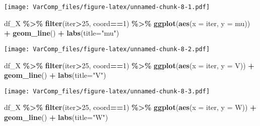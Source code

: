 \documentclass[
]{article}
\newenvironment{Shaded}{\begin{snugshade}}{\end{snugshade}}
\newcommand{\AttributeTok}[1]{\textcolor[rgb]{0.13,0.29,0.53}{#1}}
\newcommand{\DecValTok}[1]{\textcolor[rgb]{0.00,0.00,0.81}{#1}}
\newcommand{\FunctionTok}[1]{\textcolor[rgb]{0.13,0.29,0.53}{\textbf{#1}}}
\newcommand{\NormalTok}[1]{#1}
\newcommand{\SpecialCharTok}[1]{\textcolor[rgb]{0.81,0.36,0.00}{\textbf{#1}}}
\newcommand{\StringTok}[1]{\textcolor[rgb]{0.31,0.60,0.02}{#1}}
\begin{document}
\texttt{[image: VarComp\_files/figure-latex/unnamed-chunk-8-1.pdf]}

\begin{Shaded}
\begin{Highlighting}[]
\NormalTok{df\_X }\SpecialCharTok{\%\textgreater{}\%}
  \FunctionTok{filter}\NormalTok{(iter}\SpecialCharTok{\textgreater{}}\DecValTok{25}\NormalTok{, coord}\SpecialCharTok{==}\DecValTok{1}\NormalTok{) }\SpecialCharTok{\%\textgreater{}\%} 
  \FunctionTok{ggplot}\NormalTok{(}\FunctionTok{aes}\NormalTok{(}\AttributeTok{x =}\NormalTok{ iter, }\AttributeTok{y =}\NormalTok{ mu)) }\SpecialCharTok{+}
  \FunctionTok{geom\_line}\NormalTok{() }\SpecialCharTok{+} \FunctionTok{labs}\NormalTok{(}\AttributeTok{title=}\StringTok{"mu"}\NormalTok{)}
\end{Highlighting}
\end{Shaded}

\texttt{[image: VarComp\_files/figure-latex/unnamed-chunk-8-2.pdf]}

\begin{Shaded}
\begin{Highlighting}[]
\NormalTok{df\_X }\SpecialCharTok{\%\textgreater{}\%}
  \FunctionTok{filter}\NormalTok{(iter}\SpecialCharTok{\textgreater{}}\DecValTok{25}\NormalTok{, coord}\SpecialCharTok{==}\DecValTok{1}\NormalTok{) }\SpecialCharTok{\%\textgreater{}\%} 
  \FunctionTok{ggplot}\NormalTok{(}\FunctionTok{aes}\NormalTok{(}\AttributeTok{x =}\NormalTok{ iter, }\AttributeTok{y =}\NormalTok{ V)) }\SpecialCharTok{+}
  \FunctionTok{geom\_line}\NormalTok{() }\SpecialCharTok{+} \FunctionTok{labs}\NormalTok{(}\AttributeTok{title=}\StringTok{"V"}\NormalTok{)}
\end{Highlighting}
\end{Shaded}

\texttt{[image: VarComp\_files/figure-latex/unnamed-chunk-8-3.pdf]}

\begin{Shaded}
\begin{Highlighting}[]
\NormalTok{df\_X }\SpecialCharTok{\%\textgreater{}\%}
  \FunctionTok{filter}\NormalTok{(iter}\SpecialCharTok{\textgreater{}}\DecValTok{25}\NormalTok{, coord}\SpecialCharTok{==}\DecValTok{1}\NormalTok{) }\SpecialCharTok{\%\textgreater{}\%} 
  \FunctionTok{ggplot}\NormalTok{(}\FunctionTok{aes}\NormalTok{(}\AttributeTok{x =}\NormalTok{ iter, }\AttributeTok{y =}\NormalTok{ W)) }\SpecialCharTok{+}
  \FunctionTok{geom\_line}\NormalTok{() }\SpecialCharTok{+} \FunctionTok{labs}\NormalTok{(}\AttributeTok{title=}\StringTok{"W"}\NormalTok{)}
\end{Highlighting}
\end{Shaded}
\end{document}
